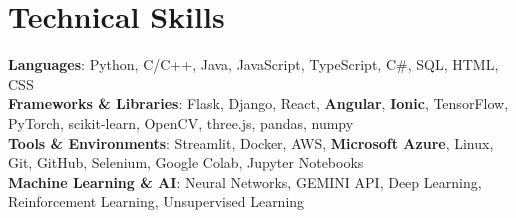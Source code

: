 \documentclass[letterpaper,10pt]{article}
\begin{document}
\section{Technical Skills}
 \begin{itemize}[leftmargin=0.15in, label={}]
    \small{\item{
     \textbf{Languages}{: Python, C/C++, Java, JavaScript, TypeScript, C\#, SQL, HTML, CSS} \\
     \textbf{Frameworks \& Libraries}{: Flask, Django, React, \textbf{Angular}, \textbf{Ionic}, TensorFlow, PyTorch, scikit-learn, OpenCV, three.js, pandas, numpy} \\
     \textbf{Tools \& Environments}{: Streamlit, Docker, AWS, \textbf{Microsoft Azure}, Linux, Git, GitHub, Selenium, Google Colab, Jupyter Notebooks} \\
     \textbf{Machine Learning \& AI}{: Neural Networks, GEMINI API, Deep Learning, Reinforcement Learning, Unsupervised Learning} \\
    }}
 \end{itemize}
\end{document}
